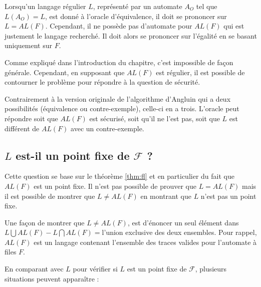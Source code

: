 Lorsqu'un langage régulier $L$, représenté par un automate $A_O$ tel que $L(A_O)=L$, est donné à l'oracle d'équivalence, il doit se prononcer sur $L=AL(F)$. Cependant, il ne possède pas d'automate pour $AL(F)$ qui est justement le langage recherché. Il doit alors se prononcer sur l'égalité en se basant uniquement sur $F$.

Comme expliqué dans l'introduction du chapitre, c'est impossible de façon générale. Cependant, en supposant que $AL(F)$ est régulier, il est possible de contourner le problème pour répondre à la question de sécurité.

Contrairement à la version originale de l'algorithme d'Angluin qui a deux possibilités (équivalence ou contre-exemple), celle-ci en a trois. L'oracle peut répondre soit que $AL(F)$ est sécurisé, soit qu'il ne l'est pas, soit que $L$ est différent de $AL(F)$ avec un contre-exemple.


\subsection{$L$ est-il un point fixe de $\mathcal{F}$ ?}

Cette question se base sur le théorème \ref{thm:fl} et en particulier du fait que $AL(F)$ est un point fixe. Il n'est pas possible de prouver que $L=AL(F)$ mais il est possible de montrer que $L\neq AL(F)$ en montrant que $L$ n'est pas un point fixe.

Une façon de montrer que $L\neq AL(F)$, est d'énoncer un seul élément dans $L\bigcup AL(F)-L\bigcap AL(F)=$\alfx l'union exclusive des deux ensembles. Pour rappel, $AL(F)$ est un langage contenant l'ensemble des traces valides pour l'automate à files $F$.

En comparant \fl avec $L$ pour vérifier si $L$ est un point fixe de $\mathcal{F}$, plusieurs situations peuvent apparaître :


